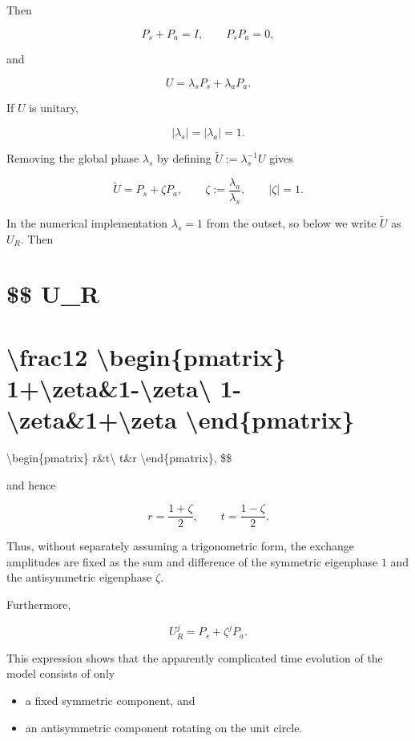 \documentclass[
  a4paper,
  10pt]{article}
\providecommand{\tightlist}{%
  \setlength{\itemsep}{0pt}\setlength{\parskip}{0pt}}
\begin{document}
Then

\[
P_s+P_a=I,
\qquad
P_sP_a=0,
\]

and

\[
U=\lambda_sP_s+\lambda_aP_a.
\]

If \(U\) is unitary,

\[
|\lambda_s|=|\lambda_a|=1.
\]

Removing the global phase \(\lambda_s\) by defining
\(\widetilde U:=\lambda_s^{-1}U\) gives

\[
\boxed{
\widetilde U=P_s+\zeta P_a,
\qquad
\zeta:=\frac{\lambda_a}{\lambda_s},
\qquad
|\zeta|=1
}.
\]

In the numerical implementation \(\lambda_s=1\) from the outset, so
below we write \(\widetilde U\) as \(U_R\). Then

\section{\$\$ U\_R}\label{-u_r}

\section{\textbackslash frac12 \textbackslash begin\{pmatrix\}
1+\textbackslash zeta\&1-\textbackslash zeta\textbackslash{}
1-\textbackslash zeta\&1+\textbackslash zeta
\textbackslash end\{pmatrix\}}\label{frac12-beginpmatrix-1zeta1-zeta-1-zeta1zeta-endpmatrix}

\textbackslash begin\{pmatrix\} r\&t\textbackslash{} t\&r
\textbackslash end\{pmatrix\}, \$\$

and hence

\[
\boxed{
r=\frac{1+\zeta}{2},
\qquad
t=\frac{1-\zeta}{2}
}.
\]

Thus, without separately assuming a trigonometric form, the exchange
amplitudes are fixed as the sum and difference of the symmetric
eigenphase \(1\) and the antisymmetric eigenphase \(\zeta\).

Furthermore,

\[
\boxed{
U_R^j=P_s+\zeta^jP_a
}.
\]

This expression shows that the apparently complicated time evolution of
the model consists of only

\begin{itemize}
\tightlist
\item
  a fixed symmetric component, and
\item
  an antisymmetric component rotating on the unit circle.
\end{itemize}
\end{document}
